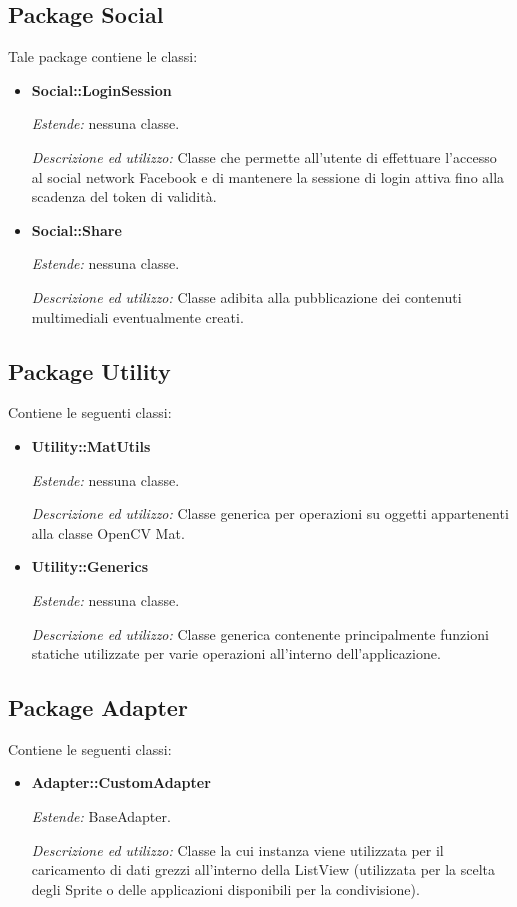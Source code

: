 \subsection{Package Social}

Tale package contiene le classi:
\begin{itemize}
\item \textbf{Social::LoginSession}

\textit{Estende:} nessuna classe.

\textit{Descrizione ed utilizzo:} Classe che permette all'utente di effettuare l'accesso al social network Facebook e di mantenere la sessione di login attiva fino alla scadenza del token di validità.

\item \textbf{Social::Share}

\textit{Estende:} nessuna classe.

\textit{Descrizione ed utilizzo:} Classe adibita alla pubblicazione dei contenuti multimediali eventualmente creati.
\end{itemize}

\subsection{Package Utility}
Contiene le seguenti classi:

\begin{itemize}

\item \textbf{Utility::MatUtils}

\textit{Estende:} nessuna classe.

\textit{Descrizione ed utilizzo:} Classe generica per operazioni su oggetti appartenenti alla classe OpenCV Mat.

\item \textbf{Utility::Generics}

\textit{Estende:} nessuna classe.

\textit{Descrizione ed utilizzo:} Classe generica contenente principalmente funzioni statiche utilizzate per varie operazioni all'interno dell'applicazione.
\end{itemize}


\subsection{Package Adapter}
Contiene le seguenti classi:

\begin{itemize}

\item \textbf{Adapter::CustomAdapter}

\textit{Estende:} BaseAdapter.

\textit{Descrizione ed utilizzo:} Classe la cui instanza viene utilizzata per il caricamento di dati grezzi all'interno della ListView (utilizzata per la scelta degli Sprite o delle applicazioni disponibili per la condivisione).

\end{itemize}

